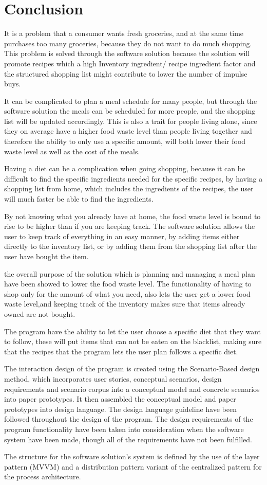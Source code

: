 \chapter{Conclusion}

It is a problem that a consumer wants fresh groceries, and at the same time purchases too many groceries, because they do not want to do much shopping. This problem is solved through the software solution because the solution will promote recipes which a high Inventory ingredient/ recipe ingredient factor and the structured shopping list might contribute to lower the number of impulse buys.

It can be complicated to plan a meal schedule for many people, but through the software solution the meals can be scheduled for more people, and the shopping list will be updated accordingly. This is also a trait for people living alone, since they on average have a higher food waste level than people living together and therefore the ability to only use a specific amount, will both lower their food waste level as well as the cost of the meals.

Having a diet can be a complication when going shopping, because it can be difficult to find the specific ingredients needed for the specific recipes, by having a shopping list from home, which includes the ingredients of the recipes, the user will much faster be able to find the ingredients.

By not knowing what you already have at home, the food waste level is bound to rise to be higher than if you are keeping track. The software solution allows the user to keep track of everything in an easy manner, by adding items either directly to the inventory list, or by adding them from the shopping list after the user have bought the item. 

the overall purpose of the solution which is planning and managing a meal plan have been showed to lower the food waste level. The functionality of having to shop only for the amount of what you need, also lets the user get a lower food waste level,and keeping track of the inventory makes sure that items already owned are not bought.

The program have the ability to let the user choose a specific diet that they want to follow, these will put items that can not be eaten on the blacklist, making sure that the recipes that the program lets the user plan follows a specific diet.

The interaction design of the program is created using the Scenario-Based design method, which incorporates user stories, conceptual scenarios, design requirements and scenario corpus into a conceptual model and concrete scenarios into paper prototypes. It then assembled the conceptual model and paper prototypes into design language. The design language guideline have been followed throughout the design of the program. The design requirements of the program functionality have been taken into consideration when the software system have been made, though all of the requirements have not been fulfilled.

The structure for the software solution's system is defined by the use of the layer pattern (MVVM) and a distribution pattern variant of the centralized pattern for the process architecture. 